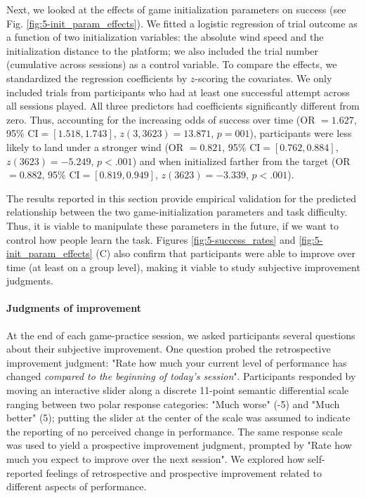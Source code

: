 Next, we looked at the effects of game initialization parameters on success (see Fig. \ref{fig:5-init_param_effects}). We fitted a logistic regression of trial outcome as a function of two initialization variables: the absolute wind speed and the initialization distance to the platform; we also included the trial number (cumulative across sessions) as a control variable. To compare the effects, we standardized the regression coefficients by $z$-scoring the covariates. We only included trials from participants who had at least one successful attempt across all sessions played. All three predictors had coefficients significantly different from zero. Thus, accounting for the increasing odds of success over time (\ac{OR} $=1.627$, 95\% CI$=[1.518, 1.743]$, $z(3, 3623) = 13.871$, $p = 001$), participants were less likely to land under a stronger wind (\ac{OR} $=0.821$, 95\% CI$=[0.762, 0.884]$, $z(3623) = -5.249$, $p<.001$) and when initialized farther from the target (\ac{OR} $=0.882$, 95\% CI$=[0.819, 0.949]$, $z(3623) = -3.339$, $p<.001$).

The results reported in this section provide empirical validation for the predicted relationship between the two game-initialization parameters and task difficulty. Thus, it is viable to manipulate these parameters in the future, if we want to control how people learn the task. Figures \ref{fig:5-success_rates} and \ref{fig:5-init_param_effects} (C) also confirm that participants were able to improve over time (at least on a group level), making it viable to study subjective improvement judgments.

\paragraph{Judgments of improvement}

At the end of each game-practice session, we asked participants several questions about their subjective improvement. One question probed the retrospective improvement judgment: "Rate how much your current level of performance has changed \textit{compared to the beginning of today's session}". Participants responded by moving an interactive slider along a discrete 11-point semantic differential scale ranging between two polar response categories: "Much worse" (-5) and "Much better" (5); putting the slider at the center of the scale was assumed to indicate the reporting of no perceived change in performance. The same response scale was used to yield a prospective improvement judgment, prompted by "Rate how much you expect to improve over the next session". We explored how self-reported feelings of retrospective and prospective improvement related to different aspects of performance.

